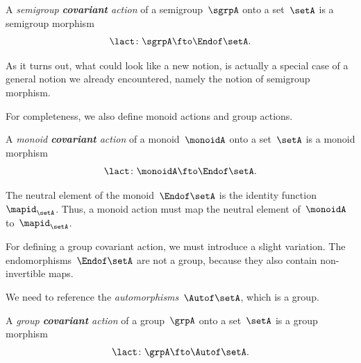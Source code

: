 \begin{ctdefinition}
    \label{def:semigroup-cov-action}
    A \emph{semigroup \textbf{covariant} action} of a semigroup~$\sgrpA$ onto a set~$\setA$ is a semigroup morphism
    \begin{equation}
        \label{eq:act-semigroup}
        \lact \colon \sgrpA \fto \Endof\setA.
    \end{equation}
\end{ctdefinition}

As it turns out, what could look like a new notion, is actually a special case of a general notion we already encountered, namely the notion of semigroup morphism.

For completeness, we also define monoid actions and group actions.

\begin{ctdefinition}
    \label{def:monoid-cov-action}
    A \emph{monoid \textbf{covariant} action} of a monoid~$\monoidA$ onto a set~$\setA$ is a monoid morphism
    \begin{equation}
        \label{eq:act-monoid}
        \lact \colon \monoidA \fto \Endof\setA.
    \end{equation}
\end{ctdefinition}

The neutral element of the monoid~$\Endof\setA$ is the identity function~$\mapid_{\setA}$.
Thus, a monoid action must map the neutral element of~$\monoidA$ to~$\mapid_{\setA}$.
%


For defining a group covariant action, we must introduce a slight variation.
The endomorphisms~$\Endof\setA$ are not a group, because they also contain non-invertible maps.

We need to reference the \emph{automorphisms}~$\Autof\setA$, which is a group.

\begin{ctdefinition}
    \label{def:group-cov-action}
    A \emph{group \textbf{covariant} action} of a group~$\grpA$ onto a set~$\setA$ is a group morphism
    \begin{equation}
        \label{eq:act-group}
        \lact \colon \grpA \fto \Autof\setA.
    \end{equation}
\end{ctdefinition}

